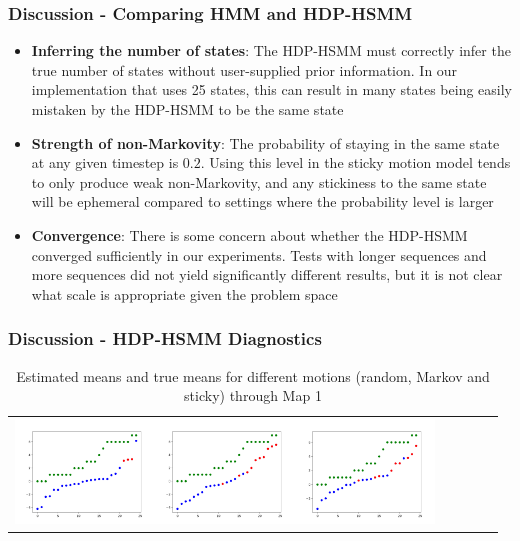 \documentclass{beamer}
\begin{document}
\begin{frame}
	\frametitle{Discussion - Comparing HMM and HDP-HSMM}
    \begin{itemize}
      \item \textbf{Inferring the number of states}: The HDP-HSMM must correctly infer the true number of states without user-supplied prior information. In our implementation that uses 25 states, this can result in many states being easily mistaken by the HDP-HSMM to be the same state
      \item \textbf{Strength of non-Markovity}: The probability of staying in the same state at any given timestep is $0.2$. Using this level in the sticky motion model tends to only produce weak non-Markovity, and any stickiness to the same state will be ephemeral compared to settings where the probability level is larger
      \item \textbf{Convergence}: There is some concern about whether the HDP-HSMM converged sufficiently in our experiments. Tests with longer sequences and more sequences did not yield significantly different results, but it is not clear what scale is appropriate given the problem space
    \end{itemize}
\end{frame}

\begin{frame}
    \frametitle{Discussion - HDP-HSMM Diagnostics}
    \newcommand{\addrandommeana}{\includegraphics[width=10em]{images/hdphsmm/random-m1-means.png}}
    \newcommand{\addmarkovmeana}{\includegraphics[width=10em]{images/hdphsmm/markov-m1-means.png}}
    \newcommand{\addcorrmeana}{\includegraphics[width=10em]{images/hdphsmm/corr-m1-means.png}}
    \begin{table}[H]
	    \sffamily
	    \centering
	    \begin{tabular}{l*4{c}@{}}
	    \addrandommeana \addmarkovmeana \addcorrmeana \\
	    \end{tabular}
	    \caption{Estimated means and true means for different motions (random, Markov and sticky) through Map 1}
	    \label{table:meaninfer}
    \end{table}
\end{frame}
\end{document}
